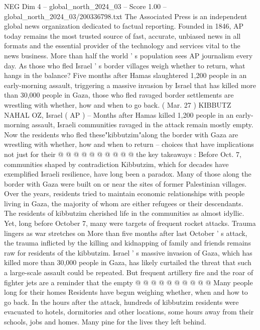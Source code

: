 \begin{textsample}{NEG Dim 4 – global\_north\_2024\_03 – Score 1.00 – global\_north\_2024\_03/200336798.txt}  \label{ex:f4_neg_212}
The Associated Press is an independent global news organization dedicated to factual reporting.
Founded in 1846, AP today remains the most trusted source of fast, accurate, unbiased news in all formats and the essential provider of the technology and services vital to the news business.
More than half the world ' s population sees AP journalism every day.
As those who fled Israel ' s border villages weigh whether to return, what hangs in the balance?
Five months after Hamas slaughtered 1,200 people in an early-morning assault, triggering a massive invasion by Israel that has killed more than 30,000 people in Gaza, those who fled ravaged border settlements are wrestling with whether, how and when to go back. ( Mar. 27 ) KIBBUTZ NAHAL OZ, Israel ( AP ) -- Months after Hamas killed 1,200 people in an early-morning assault, Israeli communities ravaged in the attack remain mostly empty.
Now the residents who fled these"kibbutzim"along the border with Gaza are wrestling with whether, how and when to return -- choices that have implications not just for their @ @ @ @ @ @ @ @ @ @ the key takeaways : Before Oct. 7, communities shaped by contradiction Kibbutzim, which for decades have exemplified Israeli resilience, have long been a paradox.
Many of those along the border with Gaza were built on or near the sites of former Palestinian villages.
Over the years, residents tried to maintain economic relationships with people living in Gaza, the majority of whom are either refugees or their descendants.
The residents of kibbutzim cherished life in the communities as almost idyllic.
Yet, long before October 7, many were targets of frequent rocket attacks.
Trauma lingers as war stretches on More than five months after last October ' s attack, the trauma inflicted by the killing and kidnapping of family and friends remains raw for residents of the kibbutzim.
Israel ' s massive invasion of Gaza, which has killed more than 30,000 people in Gaza, has likely curtailed the threat that such a large-scale assault could be repeated.
But frequent artillery fire and the roar of fighter jets are a reminder that the empty @ @ @ @ @ @ @ @ @ @ Many people long for their homes Residents have begun weighing whether, when and how to go back.
In the hours after the attack, hundreds of kibbutzim residents were evacuated to hotels, dormitories and other locations, some hours away from their schools, jobs and homes.
Many pine for the lives they left behind.

\end{textsample}
